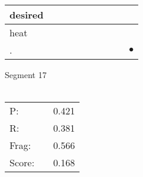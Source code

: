 \documentclass[landscape]{article}
\newcommand{\ssp}{\hspace{2pt}}
\newcommand{\mex}{\cellcolor{g}$\bullet$}
\begin{document}
\begin{tabular}{|l|p{10pt}|p{10pt}|p{10pt}|p{10pt}|p{10pt}|p{10pt}|p{10pt}|p{10pt}|p{10pt}|}
\hline
\ssp desired \ssp&\hspace{2pt}&\hspace{2pt}&\hspace{2pt}&\hspace{2pt}&\hspace{2pt}&\hspace{2pt}&\hspace{2pt}&\hspace{2pt}&\hspace{2pt}\\
\hline
\ssp heat \ssp&\hspace{2pt}&\hspace{2pt}&\hspace{2pt}&\hspace{2pt}&\hspace{2pt}&\hspace{2pt}&\hspace{2pt}&\hspace{2pt}&\hspace{2pt}\\
\hline
\ssp \cellcolor{ref8}. \ssp&\hspace{2pt}&\hspace{2pt}&\hspace{2pt}&\hspace{2pt}&\hspace{2pt}&\hspace{2pt}&\hspace{2pt}&\hspace{2pt}&\hspace{2pt}\mex\\
\hline
\end{tabular}

\vspace{6pt}
\noindent Segment 17\\\\
\noindent\begin{tabular}{lm{12pt}r}
\hline
P:&&0.421\\
R:&&0.381\\
Frag:&&0.566\\
Score:&&0.168\\
\end{tabular}

\newpage
\end{document}
